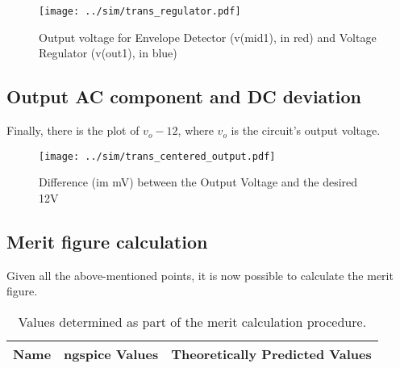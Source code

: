 \begin{figure}[H] \centering
\texttt{[image: ../sim/trans\_regulator.pdf]}
\caption{Output voltage for Envelope Detector (v(mid1), in red) and Voltage Regulator (v(out1), in blue)}
\label{fig:phase_sim}
\end{figure}


\subsection{Output AC component and DC deviation}
Finally, there is the plot of $v_o -12$, where $v_o$ is the circuit's output voltage.


\begin{figure}[H] \centering
\texttt{[image: ../sim/trans\_centered\_output.pdf]}
\caption{Difference (im mV) between the Output Voltage and the desired 12V}
\label{fig:phase_sim}
\end{figure}


\subsection{Merit figure calculation}
Given all the above-mentioned points, it is now possible to calculate the merit figure.

\begin{table}[H]
  \centering
  \begin{tabular}{|c|c|c|}
    \hline    
    {\bf Name} & {\bf ngspice Values} & {\bf Theoretically Predicted Values} \\ \hline
    
  \end{tabular}
  \caption{Values determined as part of the merit calculation procedure.}
  \label{tab:merit}
\end{table}

